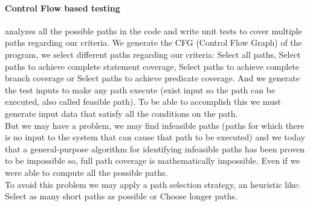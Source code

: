 \documentclass[citeauthoryear]{llncs}
\begin{document}
\paragraph{Control Flow based testing} analyzes all the possible paths in the code and write unit tests to cover multiple paths regarding our criteria.
We generate the CFG (Control Flow Graph) of the program, we select different paths regarding our criteria:
Select all paths, Select paths to achieve complete statement coverage\cite{stt,Ntafos:1988:CST:630792.631017},
Select paths to achieve complete branch coverage\cite{Roper1994,stt}
or Select paths to achieve predicate coverage\cite{stt,Ntafos:1988:CST:630792.631017}.
And we generate the test inputs to make any path execute (exist input so the path can be executed, also called feasible path).
To be able to accomplish this we must generate input data that satisfy all the conditions on the path.\\
But we may have a problem, we may find infeasible paths (paths for which there is no input to the system that can cause that path to be executed)
and we today that a general-purpose algorithm for identifying infeasible paths has been proven to be impossible\cite{infeasible} so, full path coverage
is mathematically impossible. Even if we were able to compute all the possible paths.\\
To avoid this problem we may apply a path selection strategy, an heuristic like: Select as many short paths as possible or Choose longer paths.

\end{document}
